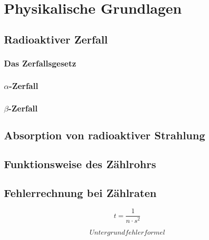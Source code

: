 \section{Physikalische Grundlagen}

\subsection{Radioaktiver Zerfall}
\subsubsection{Das Zerfallsgesetz}
\subsubsection{$\alpha$-Zerfall}
\subsubsection{$\beta$-Zerfall}


\subsection{Absorption von radioaktiver Strahlung}

\subsection{Funktionsweise des Zählrohrs}

\subsection{Fehlerrechnung bei Zählraten}

\begin{equation}
	t=\frac{1}{n \cdot s^2}
	\label{messzeit}
\end{equation}

\begin{equation}
	Untergrundfehlerformel
	\label{messzeitu}
\end{equation}